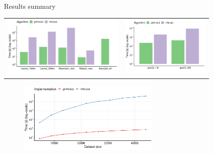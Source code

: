 \documentclass[10pt]{beamer}
\begin{document}
\begin{frame}{Results summary}
	
	\begin{tabular}{cc}
		\includegraphics[width=6cm]{../img/mixed_perf_comp} & \includegraphics[width=4.4cm]{../img/apriori_perf_comp} \\
	\end{tabular}
	\begin{figure}
		\includegraphics[width=7cm]{../img/single_perf_comp}
	\end{figure}
	
\end{frame}
\end{document}
